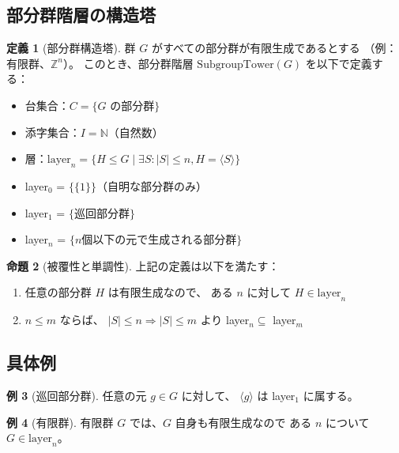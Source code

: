 \documentclass[a4paper,12pt]{ltjsarticle}
\theoremstyle{definition}
\newtheorem{definition}{定義}[section]
\newtheorem{proposition}[definition]{命題}
\newtheorem{example}[definition]{例}
\begin{document}
\subsection{部分群階層の構造塔}

\begin{definition}[部分群構造塔]
群 $G$ がすべての部分群が有限生成であるとする
（例：有限群、$\mathbb{Z}^n$）。
このとき、部分群階層 $\text{SubgroupTower}(G)$ を以下で定義する：
\begin{itemize}
  \item 台集合：$C = \{\text{$G$ の部分群}\}$
  \item 添字集合：$I = \mathbb{N}$（自然数）
  \item 層：$\text{layer}_n = \{H \leq G \mid
    \exists S : |S| \leq n, H = \langle S \rangle\}$
\end{itemize}
\end{definition}

\begin{keypoint}[層の解釈]
\begin{itemize}
  \item layer$_0$ = $\{\{1\}\}$（自明な部分群のみ）
  \item layer$_1$ = $\{$巡回部分群$\}$
  \item layer$_n$ = $\{n$個以下の元で生成される部分群$\}$
\end{itemize}
\end{keypoint}

\begin{proposition}[被覆性と単調性]
上記の定義は以下を満たす：
\begin{enumerate}
  \item 任意の部分群 $H$ は有限生成なので、
    ある $n$ に対して $H \in \text{layer}_n$
  \item $n \leq m$ ならば、
    $|S| \leq n \Rightarrow |S| \leq m$ より
    layer$_n \subseteq$ layer$_m$
\end{enumerate}
\end{proposition}

\subsection{具体例}

\begin{example}[巡回部分群]
任意の元 $g \in G$ に対して、
$\langle g \rangle$ は layer$_1$ に属する。
\end{example}

\begin{example}[有限群]
有限群 $G$ では、$G$ 自身も有限生成なので
ある $n$ について $G \in \text{layer}_n$。
\end{example}
\end{document}
